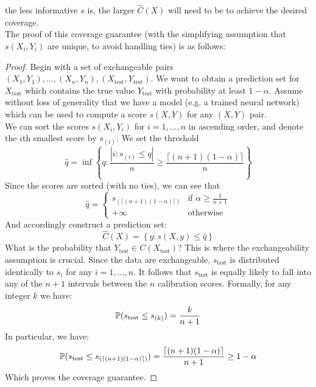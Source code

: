 \documentclass[a4paper, 12pt]{article}
\begin{document}
the less informative $s$ is, the larger $\hat{C}(X)$ will need to be to achieve the desired coverage. \\
The proof of this coverage guarantee (with the simplifying assumption that $s(X_i, Y_i)$ are unique, to avoid handling ties) is as follows:
\begin{proof}
    Begin with a set of exchangeable pairs $(X_1, Y_1), \ldots, (X_n, Y_n), (X_\text{test}, Y_\text{test})$. We
    want to obtain a prediction set for $X_{\text{test}}$ which contains the true value $Y_\text{test}$ with probability at least $1-\alpha$.
    Assume without loss of generality that we have a model (e.g. a trained neural network) which can be
    used to compute a score $s(X, Y)$ for any $(X, Y)$ pair. \\
    We can sort the scores $s(X_i, Y_i)$ for $i = 1, \ldots, n$ in ascending order, and denote the $i$th smallest score by $s_{(i)}$.
    We set the threshold
    \[\hat{q} = \inf \left\{ q: \frac{\left| i : s_{(i)} \leq q \right|}{n} \geq \frac{\lceil (n+1)(1-\alpha) \rceil }{n}\right\}\]
    Since the scores are sorted (with no ties), we can see that $$\hat{q} = \begin{cases}
            s_{(\lceil (n+1)(1-\alpha) \rceil)} & \text{if } \alpha \geq \frac{1}{n+1} \\
            +\infty                             & \text{otherwise }
        \end{cases}$$
    And accordingly construct a prediction set:
    \[\hat{C}(X) = \left\{ y: s(X, y) \leq \hat{q} \right\}\]
    What is the probability that $Y_{\text{test}} \in C(X_{\text{test}})$? This
    is where the exchangeability assumption is crucial. Since the data are exchangeable,
    $s_{\text{test}}$ is distributed identically to $s_{i}$ for any $i = 1, \ldots, n$.
    It follows that $s_{\text{test}}$ is equally likely to fall into any of the $n+1$ intervals between the $n$ calibration scores.
    Formally, for any integer $k$ we have:
    \[ \P(s_{\text{test}} \leq s_{(k)}) = \frac{k}{n+1} \]
    In particular, we have:
    \[ \P(s_{\text{test}} \leq s_{(\lceil (n+1)(1-\alpha) \rceil)}) = \frac{\lceil (n+1)(1-\alpha) \rceil}{n+1} \geq 1 - \alpha \]
    Which proves the coverage guarantee.
\end{proof}
\end{document}
